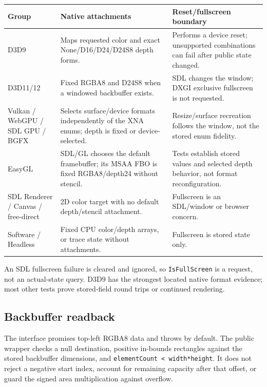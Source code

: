 \begin{center}
\small
\begin{tabular}{@{}p{}p{}p{}@{}}
\toprule
\textbf{Group} & \textbf{Native attachments} & \textbf{Reset/fullscreen boundary} \\
\midrule
D3D9 & Maps requested color and exact None/D16/D24/D24S8 depth forms. & Performs a device reset; unsupported combinations can fail after public state changed. \\
D3D11/12 & Fixed RGBA8 and D24S8 when a windowed backbuffer exists. & SDL changes the window; DXGI exclusive fullscreen is not requested. \\
Vulkan / WebGPU / SDL GPU / BGFX & Selects surface/device formats independently of the XNA enums; depth is fixed or device-selected. & Resize/surface recreation follows the window, not the stored enum fidelity. \\
EasyGL & SDL/GL chooses the default framebuffer; its MSAA FBO is fixed RGBA8/depth24 without stencil. & Tests establish stored values and selected depth behavior, not format reconfiguration. \\
SDL Renderer / Canvas / free-direct & 2D color target with no default depth/stencil attachment. & Fullscreen is an SDL/window or browser concern. \\
Software / Headless & Fixed CPU color/depth arrays, or trace state without attachments. & Fullscreen is stored state only. \\
\bottomrule
\end{tabular}
\end{center}

An SDL fullscreen failure is cleared and ignored, so \texttt{IsFullScreen} is a request, not an
actual-state query. D3D9 has the strongest located native format evidence; most other tests prove
stored-field round trips or continued rendering.

\subsection{Backbuffer readback}
\label{sec:backend-readback-matrix}

The interface promises top-left RGBA8 data and throws by default. The public wrapper checks a
null destination, positive in-bounds rectangles against the stored backbuffer dimensions, and
\texttt{elementCount < width*height}. It does not reject a negative start index, account for
remaining capacity after that offset, or guard the signed area multiplication against overflow.

